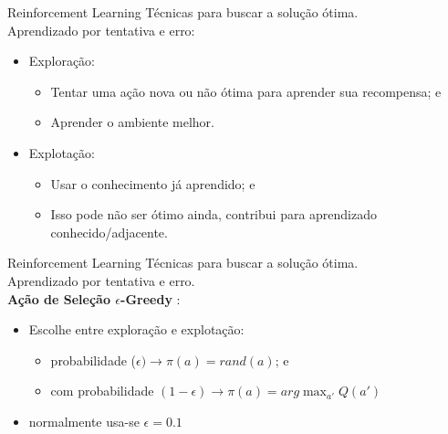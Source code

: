 \begin{frame}{Reinforcement Learning}
    Técnicas para buscar a solução ótima.\\
    \vspace{7pt}%
    Aprendizado por tentativa e erro:
    \begin{itemize}
        \item \alert{Exploração}:
        \begin{itemize}
            \item Tentar uma ação nova ou não ótima para aprender sua recompensa; e
            \item Aprender o ambiente melhor.
        \end{itemize}
        \item \alert{Explotação}:
        \begin{itemize}
            \item Usar o conhecimento já aprendido; e
            \item Isso pode não ser ótimo ainda, contribui para aprendizado conhecido/adjacente.
        \end{itemize}
    \end{itemize}
\end{frame}

\begin{frame}{Reinforcement Learning}
    Técnicas para buscar a solução ótima.\\
    \vspace{7pt}%
    Aprendizado por tentativa e erro.\\
    \vspace{7pt}%
    \textbf{Ação de Seleção $\epsilon$-Greedy} \nocite{uniFreiburgDe}:
    \begin{itemize}
        \item Escolhe entre \alert{exploração} e \alert{explotação}:
        \begin{itemize}
            \item probabilidade ($\epsilon) \rightarrow \pi(a) = rand(a)$; e
            \item com probabilidade $(1 - \epsilon) \rightarrow \pi(a) = arg \max_{a'} Q(a')$
        \end{itemize}
        \item normalmente usa-se $\epsilon = 0.1$
    \end{itemize}    
\end{frame}

